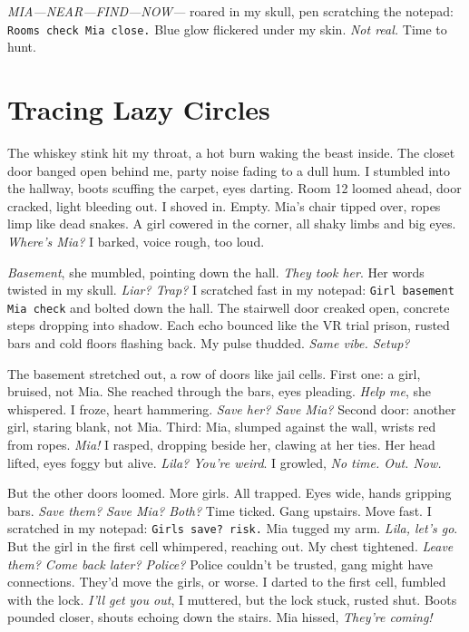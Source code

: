 \documentclass[12pt,oneside]{book} %
\newcommand{\note}[1]{\texttt{#1}}
\begin{document}
\textit{MIA—NEAR—FIND—NOW—} roared in my skull, pen scratching the notepad: \note{Rooms check Mia close.} Blue glow flickered under my skin. \textit{Not real.} Time to hunt.

\chapter{Tracing Lazy Circles}

The whiskey stink hit my throat, a hot burn waking the beast inside. The closet door banged open behind me, party noise fading to a dull hum. I stumbled into the hallway, boots scuffing the carpet, eyes darting. Room 12 loomed ahead, door cracked, light bleeding out. I shoved in. Empty. Mia’s chair tipped over, ropes limp like dead snakes. A girl cowered in the corner, all shaky limbs and big eyes. \textit{Where’s Mia?} I barked, voice rough, too loud.

\textit{Basement}, she mumbled, pointing down the hall. \textit{They took her}. Her words twisted in my skull. \textit{Liar? Trap?} I scratched fast in my notepad: \note{Girl basement Mia check} and bolted down the hall. The stairwell door creaked open, concrete steps dropping into shadow. Each echo bounced like the VR trial prison, rusted bars and cold floors flashing back. My pulse thudded. \textit{Same vibe. Setup?}

The basement stretched out, a row of doors like jail cells. First one: a girl, bruised, not Mia. She reached through the bars, eyes pleading. \textit{Help me}, she whispered. I froze, heart hammering. \textit{Save her? Save Mia?} Second door: another girl, staring blank, not Mia. Third: Mia, slumped against the wall, wrists red from ropes. \textit{Mia!} I rasped, dropping beside her, clawing at her ties. Her head lifted, eyes foggy but alive. \textit{Lila? You’re weird}. I growled, \textit{No time. Out. Now.}

But the other doors loomed. More girls. All trapped. Eyes wide, hands gripping bars. \textit{Save them? Save Mia? Both?} Time ticked. Gang upstairs. Move fast. I scratched in my notepad: \note{Girls save? risk.} Mia tugged my arm. \textit{Lila, let’s go}. But the girl in the first cell whimpered, reaching out. My chest tightened. \textit{Leave them? Come back later? Police?} Police couldn’t be trusted, gang might have connections. They’d move the girls, or worse. I darted to the first cell, fumbled with the lock. \textit{I’ll get you out}, I muttered, but the lock stuck, rusted shut. Boots pounded closer, shouts echoing down the stairs. Mia hissed, \textit{They’re coming!}
\end{document}

